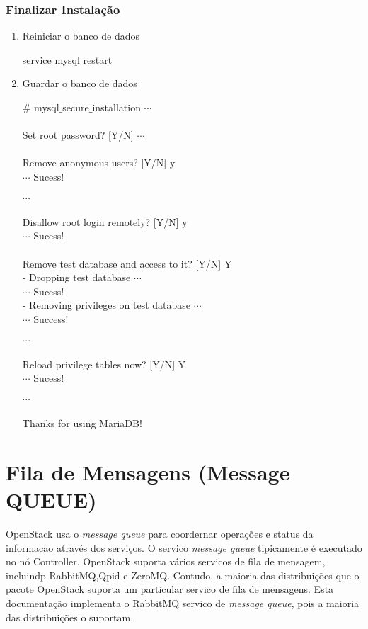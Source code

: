 \documentclass[a4paper]{book}
\begin{document}
					\subsubsection{Finalizar Instalação}
			\begin{enumerate}
				\item Reiniciar o banco de dados
				\begin{snugshade}
					service mysql restart
				\end{snugshade}
				
				\item Guardar o banco de dados
				\begin{snugshade}
				\# mysql$\_$secure$\_$installation
				$\cdots$ \\  \\
				Set root password? [Y/N]
				$\cdots$ \\ \\
				Remove anonymous users? [Y/N] y \\
				$\cdots$ Sucess! \\ \\
				$\cdots$ \\ \\
				Disallow root login remotely? [Y/N] y \\
				$\cdots$ Sucess! \\ \\
				Remove test database and access to it? [Y/N] Y \\
				- Dropping test database $\cdots$ \\
				$\cdots$ Sucess! \\ 
				- Removing privileges on test database $\cdots$ \\
				$\cdots$ Success! \\ \\
				$\cdots$ \\ \\
				Reload privilege tables now? [Y/N] Y		\\
				$\cdots$	 Sucess! \\ \\
				$\cdots$ \\ \\
				Thanks for using MariaDB!
				\end{snugshade}								
			\end{enumerate}

			\section{Fila de Mensagens (Message QUEUE)}
			OpenStack usa o \emph{message queue}	para coordernar operações e  status da informacao através dos serviços. O servico \emph{message queue} tipicamente é executado no nó Controller. OpenStack suporta vários servicos de fila de mensagem, incluindp RabbitMQ,Qpid e ZeroMQ. Contudo, a maioria das distribuições que o pacote OpenStack suporta um particular servico de fila de mensagens. Esta documentação implementa o RabbitMQ servico de \emph{message queue}, pois a maioria das distribuições o suportam. 
			
\end{document}

